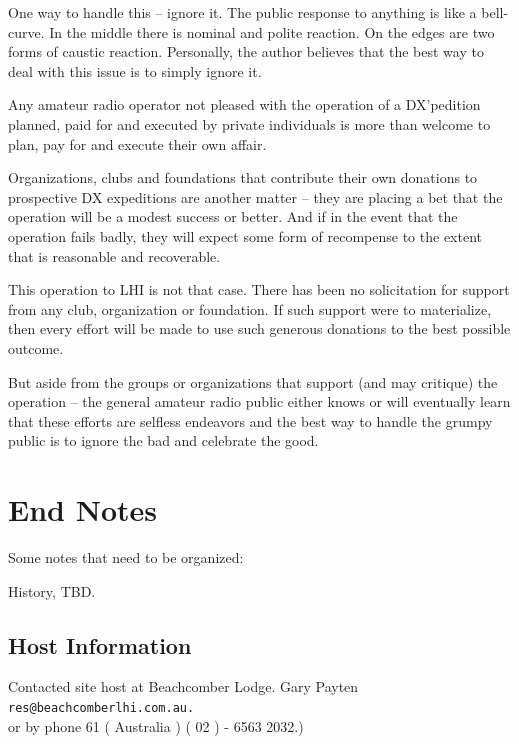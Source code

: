 \documentclass[11pt]{article}
\begin{document}
One way to handle this -- ignore it.   The public response to anything
is like a bell-curve.  In the middle there is nominal and polite reaction.
On the edges are two forms of caustic reaction.  Personally, the author
believes that the best way to deal with this issue is to simply ignore it.
\par
Any amateur radio operator not pleased with the operation of a DX'pedition
planned, paid for and executed by private individuals is more than welcome
to plan, pay for and execute their own affair.
\par
Organizations, clubs and foundations that contribute their own donations
to prospective DX expeditions are another matter -- they are placing a bet
that the operation will be a modest success or better.  And if in the
event that the operation fails badly, they will expect some form of
recompense to the extent that is reasonable and recoverable.
\par
This operation to LHI is not that case.  There has been no solicitation
for support from any club, organization or foundation.  If such
support were to materialize, then every effort will be made to use such
generous donations to the best possible outcome.
\par
But aside from the groups or organizations that support (and may 
critique) the operation -- the general amateur radio public either knows
or will eventually learn that these efforts are selfless endeavors
and the best way to handle the grumpy public is to ignore the bad and
celebrate the good.


\section{End Notes}

Some notes that need to be organized:
\par
History, TBD.
\par

\subsection{Host Information}
Contacted site host at Beachcomber Lodge.
Gary Payten\\
{\small\texttt{res@beachcomberlhi.com.au.}}\\
or by phone 61 ( Australia )  ( 02 ) - 6563 2032.)

\appendix
\end{document}
